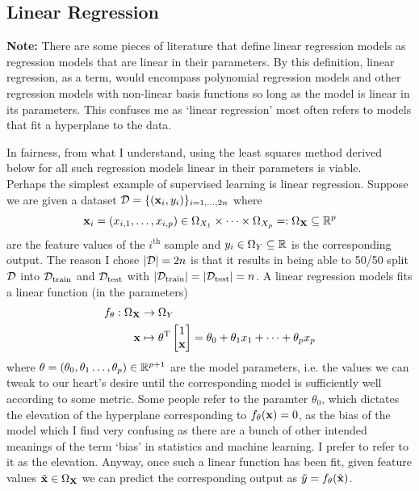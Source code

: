 \documentclass[11pt]{article}
\begin{document}
\subsection{Linear Regression}

\textbf{Note:} There are some pieces of literature that define linear regression models as regression models that are linear in their parameters. By this definition, linear regression, as a term, would encompass polynomial regression models and other regression models with non-linear basis functions so long as the model is linear in its parameters. This confuses me as `linear regression' most often refers to models that fit a hyperplane to the data.

In fairness, from what I understand, using the least squares method derived below for all such regression models linear in their parameters is viable.\\

\noindent Perhaps the simplest example of supervised learning is linear regression. Suppose we are given a dataset $\mathcal{D}=\{(\mathbf{x}_i,y_i)\}_{i=1,\dots,2n}$ where
$$
\mathbf{x}_i=(x_{i,1},\dots,x_{i, p})\in \Omega_{X_1}\times\dots\times \Omega_{X_p}=:\Omega_{\mathbf{X}}\subseteq\mathbb{R}^p
$$
are the feature values of the $i^{\text{th}}$ sample and $y_i\in \Omega_{Y}\subseteq\mathbb{R}$ is the corresponding output. The reason I chose $|\mathcal{D}|=2n$ is that it results in being able to 50/50 split $\mathcal{D}$ into $\mathcal{D}_{\text{train}}$ and $\mathcal{D}_{\text{test}}$ with $|\mathcal{D}_{\text{train}}|=|\mathcal{D}_{\text{test}}|=n$. A linear regression models fits a linear function (in the parameters)
\begin{align*}
    f_{\theta}:\Omega_{\mathbf{X}}&\rightarrow \Omega_Y\\
    \mathbf{x}&\mapsto
    \theta^{\text{T}}
    \begin{bmatrix}
        1\\
        \mathbf{x}
    \end{bmatrix}
    =
    \theta_0+\theta_1x_1+\dots+\theta_px_p    
\end{align*}
where $\theta=(\theta_0,\theta_1\dots,\theta_p)\in\mathbb{R}^{p+1}$ are the model parameters, i.e. the values we can tweak to our heart's desire until the corresponding model is sufficiently well according to some metric. Some people refer to the paramter $\theta_0$, which dictates the elevation of the hyperplane corresponding to $f_{\theta}(\mathbf{x})=0$, as the bias of the model which I find very confusing as there are a bunch of other intended meanings of the term `bias' in statistics and machine learning. I prefer to refer to it as the elevation. Anyway, once such a linear function has been fit, given feature values $\tilde{\mathbf{x}}\in\Omega_{\mathbf{X}}$ we can predict the corresponding output as $\tilde{y}=f_{\theta}(\tilde{\mathbf{x}})$.
\end{document}
